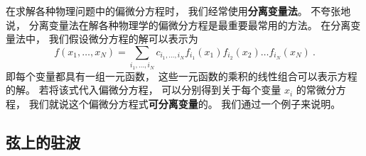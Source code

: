 
\begin{issues}
\issueDraft
\end{issues}

在求解各种物理问题中的偏微分方程时， 我们经常使用\textbf{分离变量法}。 不夸张地说， 分离变量法在解各种物理学的偏微分方程是最重要最常用的方法。 在分离变量法中， 我们假设微分方程的解可以表示为
\begin{equation}\label{SepVar_eq2}
f(x_1, \dots , x_N) = \sum_{i_1, \dots, i_N} c_{i_1, \dots, i_N} f_{i_1}(x_1) f_{i_2}(x_2) \dots f_{i_N}(x_N)~.
\end{equation}
即每个变量都具有一组一元函数， 这些一元函数的乘积的线性组合可以表示方程的解。 若将该式代入偏微分方程， 可以分别得到关于每个变量 $x_i$ 的常微分方程， 我们就说这个偏微分方程式\textbf{可分离变量}的。 我们通过一个例子来说明。









\subsection{弦上的驻波}


